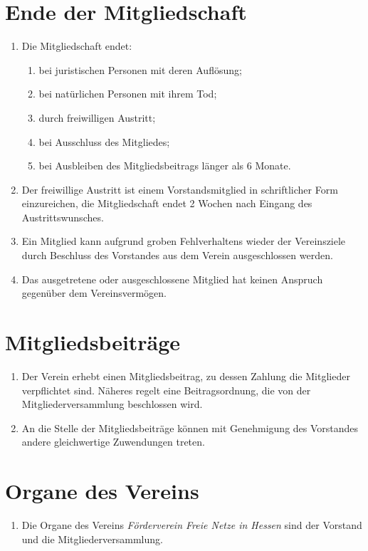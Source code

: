 \documentclass[ngerman]{article}
\newcommand{\NameVerein}{Förderverein Freie Netze in Hessen}
\begin{document}
\section{Ende der Mitgliedschaft}
\begin{enumerate}
  \item Die Mitgliedschaft endet:
  \begin{enumerate}
    \item bei juristischen Personen mit deren Auflösung;
    \item bei natürlichen Personen mit ihrem Tod;
    \item durch freiwilligen Austritt;
    \item bei Ausschluss des Mitgliedes;
    \item bei Ausbleiben des Mitgliedsbeitrags länger als 6 Monate.
  \end{enumerate}
  \item Der freiwillige Austritt ist einem Vorstandsmitglied in schriftlicher Form einzureichen, die Mitgliedschaft endet 2 Wochen nach Eingang des Austrittswunsches.
  \item Ein Mitglied kann aufgrund groben Fehlverhaltens wieder der Vereinsziele durch Beschluss des Vorstandes aus dem Verein ausgeschlossen werden.
  \item Das ausgetretene oder ausgeschlossene Mitglied hat keinen Anspruch gegenüber dem Vereinsvermögen.
\end{enumerate}


\section{Mitgliedsbeiträge}
\begin{enumerate}
  \item Der Verein erhebt einen Mitgliedsbeitrag, zu dessen Zahlung die Mitglieder verpflichtet sind. Näheres regelt eine Beitragsordnung, die von der Mitgliederversammlung beschlossen wird.
  \item An die Stelle der Mitgliedsbeiträge können mit Genehmigung des Vorstandes andere gleichwertige Zuwendungen treten.
\end{enumerate}


\section{Organe des Vereins}
\begin{enumerate}
  \item Die Organe des Vereins \emph{\NameVerein} sind der Vorstand und die Mitgliederversammlung.
\end{enumerate}
\end{document}
